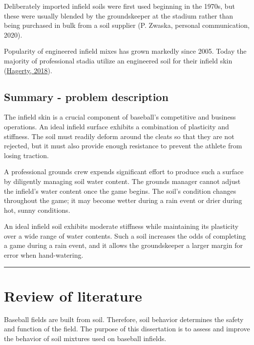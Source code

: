 \documentclass[
  letterpaper,
  openany]{book}
\begin{document}
Deliberately imported infield soils were first used beginning in the 1970s, but these were usually blended by the groundskeeper at the stadium rather than being purchased in bulk from a soil supplier (P. Zwaska, personal communication, 2020).

Popularity of engineered infield mixes has grown markedly since 2005. Today the majority of professional stadia utilize an engineered soil for their infield skin (\protect\hyperlink{ref-Hagerty2018}{Hagerty, 2018}).

\hypertarget{summary---problem-description}{%
\section{Summary - problem description}\label{summary---problem-description}}

The infield skin is a crucial component of baseball's competitive and business operations.
An ideal infield surface exhibits a combination of plasticity and stiffness.
The soil must readily deform around the cleats so that they are not rejected, but it must also provide enough resistance to prevent the athlete from losing traction.

A professional grounds crew expends significant effort to produce such a surface by diligently managing soil water content.
The grounds manager cannot adjust the infield's water content once the game begins.
The soil's condition changes throughout the game; it may become wetter during a rain event or drier during hot, sunny conditions.

An ideal infield soil exhibits moderate stiffness while maintaining its plasticity over a wide range of water contents.
Such a soil increases the odds of completing a game during a rain event, and it allows the groundskeeper a larger margin for error when hand-watering.

\begin{center}\rule{0.5\linewidth}{0.5pt}\end{center}

\hypertarget{lit-review}{%
\chapter{Review of literature}\label{lit-review}}

Baseball fields are built from soil.
Therefore, soil behavior determines the safety and function of the field.
The purpose of this dissertation is to assess and improve the behavior of soil mixtures used on baseball infields.
\end{document}
